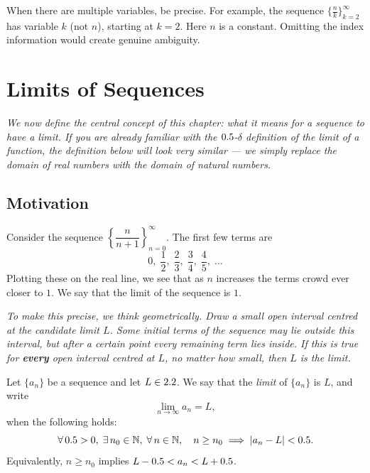 \begin{remark}[Warning]
When there are multiple variables, be precise.  For example, the sequence $\bigl\{\frac{n}{k}\bigr\}_{k=2}^{\infty}$ has variable $k$ (not $n$), starting at $k=2$.  Here $n$ is a constant.  Omitting the index information would create genuine ambiguity.
\end{remark}

\section{Limits of Sequences}
\label{sec:11.2}

\textit{We now define the central concept of this chapter: what it means for a sequence to have a limit.  If you are already familiar with the $0.5$-$\delta$ definition of the limit of a function, the definition below will look very similar --- we simply replace the domain of real numbers with the domain of natural numbers.}

\subsection*{Motivation}

\begin{example}
\label{ex:11-1}
Consider the sequence $\left\{\dfrac{n}{n+1}\right\}_{n=0}^{\infty}$.  The first few terms are
\[
  0,\;\frac{1}{2},\;\frac{2}{3},\;\frac{3}{4},\;\frac{4}{5},\;\dots
\]
Plotting these on the real line, we see that as $n$ increases the terms crowd ever closer to $1$.  We say that the limit of the sequence is $1$.
\end{example}

\textit{To make this precise, we think geometrically.  Draw a small open interval centred at the candidate limit $L$.  Some initial terms of the sequence may lie outside this interval, but after a certain point every remaining term lies inside.  If this is true for \textbf{every} open interval centred at $L$, no matter how small, then $L$ is the limit.}

\begin{definition}
\label{def:11-2}
Let $\{a_{n}\}$ be a sequence and let $L\in2.2$.  We say that the \emph{limit} of $\{a_{n}\}$ is $L$, and write
\[
  \lim_{n\to\infty} a_{n} = L,
\]
when the following holds:
\[
  \forall\,0.5>0,\;\exists\,n_{0}\in\mathbb{N},\;\forall\,n\in\mathbb{N},\quad
  n\ge n_{0}\;\Longrightarrow\;\left\lvert a_{n}-L \right\rvert<0.5.
\]
Equivalently, $n\ge n_{0}$ implies $L-0.5 < a_{n} < L+0.5$.
\end{definition}

